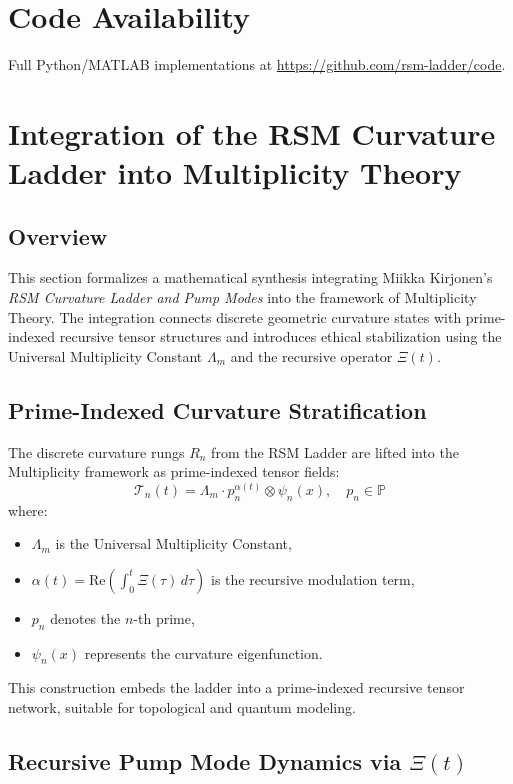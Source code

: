 \documentclass[12pt]{article}
\theoremstyle{plain}
\begin{document}
\section*{Code Availability}
Full Python/MATLAB implementations at \url{https://github.com/rsm-ladder/code}.

\section{Integration of the RSM Curvature Ladder into Multiplicity Theory}

\subsection{Overview}

This section formalizes a mathematical synthesis integrating Miikka Kirjonen’s \textit{RSM Curvature Ladder and Pump Modes} into the framework of Multiplicity Theory. The integration connects discrete geometric curvature states with prime-indexed recursive tensor structures and introduces ethical stabilization using the Universal Multiplicity Constant $\Lambda_m$ and the recursive operator $\Xi(t)$.

\subsection{Prime-Indexed Curvature Stratification}

The discrete curvature rungs $R_n$ from the RSM Ladder are lifted into the Multiplicity framework as prime-indexed tensor fields:
\[
\mathcal{T}_n(t) = \Lambda_m \cdot p_n^{\alpha(t)} \otimes \psi_n(x), \quad p_n \in \mathbb{P}
\]
where:
\begin{itemize}
    \item $\Lambda_m$ is the Universal Multiplicity Constant,
    \item $\alpha(t) = \mathrm{Re}\left(\int_0^t \Xi(\tau)\,d\tau\right)$ is the recursive modulation term,
    \item $p_n$ denotes the $n$-th prime,
    \item $\psi_n(x)$ represents the curvature eigenfunction.
\end{itemize}
This construction embeds the ladder into a prime-indexed recursive tensor network, suitable for topological and quantum modeling.

\subsection{Recursive Pump Mode Dynamics via $\Xi(t)$}
\end{document}
